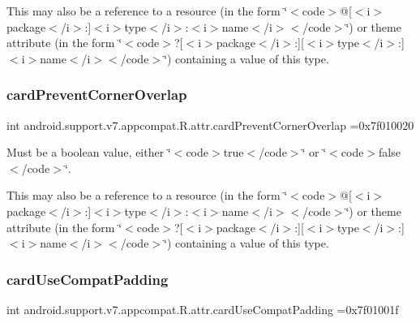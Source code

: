 This may also be a reference to a resource (in the form \char`\"{}$<$code$>$@\mbox{[}$<$i$>$package$<$/i$>$\+:\mbox{]}$<$i$>$type$<$/i$>$\+:$<$i$>$name$<$/i$>$$<$/code$>$\char`\"{}) or theme attribute (in the form \char`\"{}$<$code$>$?\mbox{[}$<$i$>$package$<$/i$>$\+:\mbox{]}\mbox{[}$<$i$>$type$<$/i$>$\+:\mbox{]}$<$i$>$name$<$/i$>$$<$/code$>$\char`\"{}) containing a value of this type. \mbox{\label{classandroid_1_1support_1_1v7_1_1appcompat_1_1R_1_1attr_a229805ad136083f3fc03e00ad650e071}} 
\subsubsection{\texorpdfstring{card\+Prevent\+Corner\+Overlap}{cardPreventCornerOverlap}}
{\footnotesize\ttfamily int android.\+support.\+v7.\+appcompat.\+R.\+attr.\+card\+Prevent\+Corner\+Overlap =0x7f010020\hspace{0.3cm}{\ttfamily [static]}}

Must be a boolean value, either \char`\"{}$<$code$>$true$<$/code$>$\char`\"{} or \char`\"{}$<$code$>$false$<$/code$>$\char`\"{}. 

This may also be a reference to a resource (in the form \char`\"{}$<$code$>$@\mbox{[}$<$i$>$package$<$/i$>$\+:\mbox{]}$<$i$>$type$<$/i$>$\+:$<$i$>$name$<$/i$>$$<$/code$>$\char`\"{}) or theme attribute (in the form \char`\"{}$<$code$>$?\mbox{[}$<$i$>$package$<$/i$>$\+:\mbox{]}\mbox{[}$<$i$>$type$<$/i$>$\+:\mbox{]}$<$i$>$name$<$/i$>$$<$/code$>$\char`\"{}) containing a value of this type. \mbox{\label{classandroid_1_1support_1_1v7_1_1appcompat_1_1R_1_1attr_a77f77f99bdcd93281a13980ef0141585}} 
\subsubsection{\texorpdfstring{card\+Use\+Compat\+Padding}{cardUseCompatPadding}}
{\footnotesize\ttfamily int android.\+support.\+v7.\+appcompat.\+R.\+attr.\+card\+Use\+Compat\+Padding =0x7f01001f\hspace{0.3cm}{\ttfamily [static]}}

